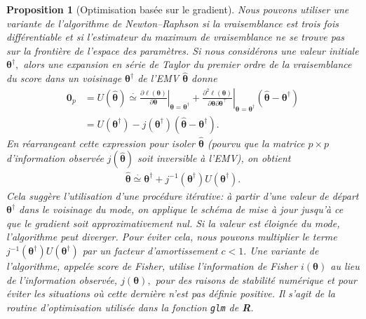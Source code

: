 \documentclass[
  11pt,
  letterpaper,
]{scrbook}
\theoremstyle{plain}
\newtheorem{proposition}{Proposition}[chapter]
\theoremstyle{plain}
\theoremstyle{definition}
\theoremstyle{definition}
\theoremstyle{remark}
\begin{document}
\begin{proposition}[Optimisation basée sur le
gradient]
Nous pouvons utiliser une variante de l'algorithme de Newton--Raphson si
la vraisemblance est trois fois différentiable et si l'estimateur du
maximum de vraisemblance ne se trouve pas sur la frontière de l'espace
des paramètres. Si nous considérons une valeur initiale
\(\boldsymbol{\theta}^{\dagger},\) alors une expansion en série de
Taylor du premier ordre de la vraisemblance du score dans un voisinage
\(\boldsymbol{\theta}^{\dagger}\) de l'EMV
\(\widehat{\boldsymbol{\theta}}\) donne \begin{align*}
\boldsymbol{0}_p & = U(\widehat{\boldsymbol{\theta}}) \stackrel{\cdot}{\simeq} \left.
\frac{\partial \ell(\boldsymbol{\theta})}{\partial \boldsymbol{\theta}} \right|_{\boldsymbol{\theta} = \boldsymbol{\theta}^{\dagger}} + \left.
\frac{\partial^2 \ell(\boldsymbol{\theta})}{\partial \boldsymbol{\theta} \partial \boldsymbol{\theta}^\top}\right|_{\boldsymbol{\theta} = \boldsymbol{\theta}^{\dagger}}(\widehat{\boldsymbol{\theta}} - \boldsymbol{\theta}^{\dagger})\\&=U(\boldsymbol{\theta}^{\dagger}) - j(\boldsymbol{\theta}^{\dagger})(\widehat{\boldsymbol{\theta}} - \boldsymbol{\theta}^{\dagger}).
\end{align*} En réarrangeant cette expression pour isoler
\(\widehat{\boldsymbol{\theta}}\) (pourvu que la matrice \(p \times p\)
d'information observée \(j(\widehat{\boldsymbol{\theta}})\) soit
inversible à l'EMV), on obtient \begin{align*}
\widehat{\boldsymbol{\theta}} \stackrel{\cdot}{\simeq} \boldsymbol{\theta}^{\dagger} + 
j^{-1}(\boldsymbol{\theta}^{\dagger})U(\boldsymbol{\theta}^{\dagger}).
\end{align*} Cela suggère l'utilisation d'une procédure itérative: à
partir d'une valeur de départ \(\boldsymbol{\theta}^{\dagger}\) dans le
voisinage du mode, on applique le schéma de mise à jour jusqu'à ce que
le gradient soit approximativement nul. Si la valeur est éloignée du
mode, l'algorithme peut diverger. Pour éviter cela, nous pouvons
multiplier le terme
\(j^{-1}(\boldsymbol{\theta}^{\dagger})U(\boldsymbol{\theta}^{\dagger})\)
par un facteur d'amortissement \(c<1.\) Une variante de l'algorithme,
appelée score de Fisher, utilise l'information de Fisher
\(i(\boldsymbol{\theta})\) au lieu de l'information observée,
\(j(\boldsymbol{\theta}),\) pour des raisons de stabilité numérique et
pour éviter les situations où cette dernière n'est pas définie positive.
Il s'agit de la routine d'optimisation utilisée dans la fonction
\texttt{glm} de \textbf{R}.

\end{proposition}
\end{document}
